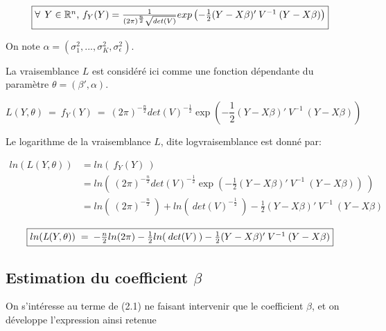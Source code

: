 \documentclass[11pt,fleqn]{book} %
\begin{document}
\begin{equation*}
\fbox{$
\forall\:\: Y \in \mathbb{R}^{n}$, $f_{Y}(Y)=\frac{1}{(2\pi)^{\frac{n}{2}}\sqrt{det(V)}}exp\left(-\frac{1}{2}(Y-X\beta)'\:V^{-1}\:(Y-X\beta)\right) 
$}
\end{equation*}

\vspace{1em}

On note $\alpha=(\sigma_1^2,...,\sigma_K^2,\sigma_{\epsilon}^2)$.


\vspace{1em}

La vraisemblance $L$ est considéré ici comme une fonction dépendante du paramètre $\theta=(\beta',\alpha)$.


\begin{equation*}
\textit{L}(Y,\theta) \:=\:  f_{Y}(Y) \:=\:  (2\pi)^{-\frac{n}{2}} det(V)^{-\frac{1}{2}} \exp\left(-\frac{1}{2}(Y-X\beta)'\:V^{-1}\:(Y-X\beta)\right)
\end{equation*}

\vspace{1em}

Le logarithme de la vraisemblance $L$, dite logvraisemblance est donné par:

\begin{align*}
ln(\textit{L}(Y,\theta)) &= ln(\: f_{Y}(Y) \:)\\
                        &= ln\left(\: (2\pi)^{-\frac{n}{2}} det(V)^{-\frac{1}{2}} \exp\left(-\frac{1}{2}(Y-X\beta)'\:V^{-1}\:(Y-X\beta)\right) \: \right) \\
						&= ln(\:(2\pi)^{-\frac{n}{2}}\:) + ln(\:det(V)^{-\frac{1}{2}}\:) -\frac{1}{2} (Y-X\beta)'\:V^{-1}\:(Y-X\beta) 
\end{align*}


\begin{equation}
\fbox{$
 ln(\textit{L}(Y,\theta)) \;=\: -\frac{n}{2} ln(2\pi) -\frac{1}{2} ln(\:det(V)\:) -\frac{1}{2}  (Y-X\beta)'\:V^{-1}\:(Y-X\beta)
 $}
\end{equation}

\vspace{2em}

\subsection{Estimation du coefficient $\beta$}

\vspace{2em}

On s'intéresse au terme de (2.1) ne faisant intervenir que le coefficient $\beta$, et on développe l'expression ainsi retenue
\end{document}
